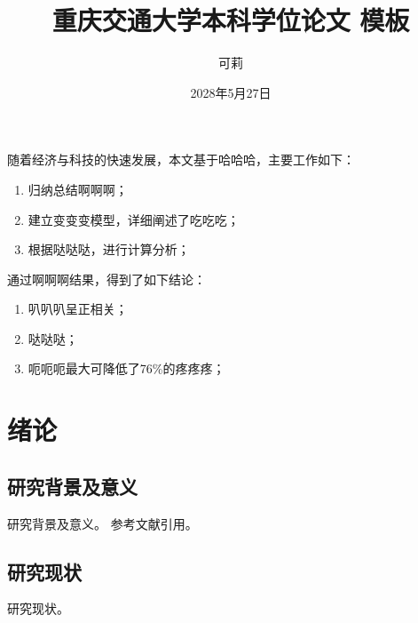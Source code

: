 \documentclass{thesis-cqjtu}
\title{重庆交通大学本科学位论文 \XeLaTeX 模板}    %
\author{可莉}                                 %
\date{2028年5月27日}                           %
\begin{document}
\sloppy %

\makecover
{}
\originality

\begin{cnabstract}
    随着经济与科技的快速发展，本文基于哈哈哈，主要工作如下：
    \begin{enumerate}
        \item 归纳总结啊啊啊；
        \item 建立变变变模型，详细阐述了吃吃吃；
        \item 根据哒哒哒，进行计算分析；
    \end{enumerate}

    通过啊啊啊结果，得到了如下结论：

    \begin{enumerate}
        \item 叭叭叭呈正相关；
        \item 哒哒哒；
        \item 呃呃呃最大可降低了76\%的疼疼疼；
    \end{enumerate}

\end{cnabstract}

\begin{enabstract}
\lipsum %


\end{enabstract}

\tableofcontents

\clearpage
\pagestyle{plain}
\afterpage{\pagestyle{plain}} %

\section{绪\qquad{}论}

\subsection{研究背景及意义}
研究背景及意义。
参考文献引用。
\subsection{研究现状}
研究现状。
\end{document}
